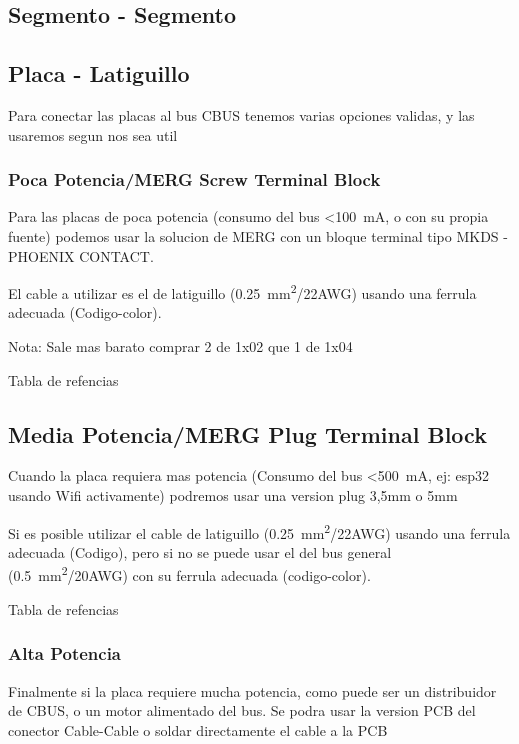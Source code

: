 
\subsection{Segmento - Segmento}


\subsection{Placa - Latiguillo}
Para conectar las placas al bus CBUS tenemos varias opciones validas, y las usaremos segun nos sea util

\subsubsection{Poca Potencia/MERG Screw Terminal Block}
Para las placas de poca potencia (consumo del bus <\SI{100}{\milli\ampere}, o con su propia fuente) podemos usar la solucion de MERG con un bloque terminal tipo MKDS - PHOENIX CONTACT.

El cable a utilizar es el de latiguillo (\SI{0,25}{\milli\metre\squared}/22AWG) usando una ferrula adecuada (Codigo-color). 

\begin{mdframed}
Nota: Sale mas barato comprar 2 de 1x02 que 1 de 1x04 
\end{mdframed}

Tabla de refencias 

\subsection{Media Potencia/MERG Plug Terminal Block}
Cuando la placa requiera mas potencia (Consumo del bus <\SI{500}{\milli\ampere}, ej: esp32 usando Wifi activamente)  podremos usar una version plug 3,5mm o 5mm

Si es posible utilizar el cable de latiguillo (\SI{0,25}{\milli\metre\squared}/22AWG) usando una ferrula adecuada (Codigo), pero si no se puede usar el del bus general
(\SI{0,5}{\milli\metre\squared}/20AWG) con su ferrula adecuada (codigo-color). 

Tabla de refencias 
\subsubsection{Alta Potencia}
Finalmente si la placa requiere mucha potencia, como puede ser un distribuidor de CBUS, o un motor alimentado del bus. Se podra usar la version PCB del conector Cable-Cable o soldar directamente el cable a la PCB

